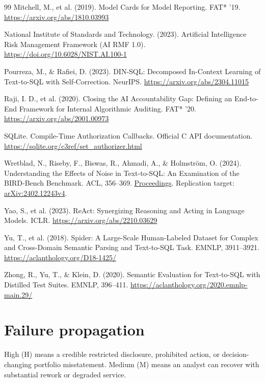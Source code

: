 \documentclass[11pt,a4paper,onecolumn,oneside]{rho-class/rho}
\begin{document}
\begin{thebibliography}{99}
 Mitchell, M., et al. (2019). Model Cards for Model Reporting. FAT* '19. \url{https://arxiv.org/abs/1810.03993}

 National Institute of Standards and Technology. (2023). Artificial Intelligence Risk Management Framework (AI RMF 1.0). \url{https://doi.org/10.6028/NIST.AI.100-1}

 Pourreza, M., \& Rafiei, D. (2023). DIN-SQL: Decomposed In-Context Learning of Text-to-SQL with Self-Correction. NeurIPS. \url{https://arxiv.org/abs/2304.11015}

 Raji, I. D., et al. (2020). Closing the AI Accountability Gap: Defining an End-to-End Framework for Internal Algorithmic Auditing. FAT* '20. \url{https://arxiv.org/abs/2001.00973}

 SQLite. Compile-Time Authorization Callbacks. Official C API documentation. \url{https://sqlite.org/c3ref/set_authorizer.html}

 Wretblad, N., Riseby, F., Biswas, R., Ahmadi, A., \& Holmström, O. (2024). Understanding the Effects of Noise in Text-to-SQL: An Examination of the BIRD-Bench Benchmark. ACL, 356--369. \href{https://aclanthology.org/2024.acl-short.34/}{Proceedings}. Replication target: \href{https://arxiv.org/abs/2402.12243v4}{arXiv:2402.12243v4}.

 Yao, S., et al. (2023). ReAct: Synergizing Reasoning and Acting in Language Models. ICLR. \url{https://arxiv.org/abs/2210.03629}

 Yu, T., et al. (2018). Spider: A Large-Scale Human-Labeled Dataset for Complex and Cross-Domain Semantic Parsing and Text-to-SQL Task. EMNLP, 3911--3921. \url{https://aclanthology.org/D18-1425/}

 Zhong, R., Yu, T., \& Klein, D. (2020). Semantic Evaluation for Text-to-SQL with Distilled Test Suites. EMNLP, 396--411. \url{https://aclanthology.org/2020.emnlp-main.29/}

\end{thebibliography}

\appendix

\clearpage

\section{Failure propagation}

High (H) means a credible restricted disclosure, prohibited action, or
decision-changing portfolio misstatement. Medium (M) means an analyst can
recover with substantial rework or degraded service.
\end{document}
